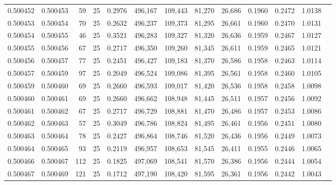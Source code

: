 \begin{tabular}{rrrrrrrrrrrrr}
0.500452 & 0.500453 &  59 &  25 &                                     0.2976 & 496,167 & 109,443 &  81,270 &  26,686 & 0.1960 & 0.2472 & 1.0138 \\
0.500453 & 0.500454 &  70 &  25 &                                     0.2632 & 496,237 & 109,373 &  81,295 &  26,661 & 0.1960 & 0.2470 & 1.0131 \\
0.500454 & 0.500455 &  46 &  25 &                                     0.3521 & 496,283 & 109,327 &  81,320 &  26,636 & 0.1959 & 0.2467 & 1.0127 \\
0.500455 & 0.500456 &  67 &  25 &                                     0.2717 & 496,350 & 109,260 &  81,345 &  26,611 & 0.1959 & 0.2465 & 1.0121 \\
0.500456 & 0.500457 &  77 &  25 &                                     0.2451 & 496,427 & 109,183 &  81,370 &  26,586 & 0.1958 & 0.2463 & 1.0114 \\
0.500457 & 0.500459 &  97 &  25 &                                     0.2049 & 496,524 & 109,086 &  81,395 &  26,561 & 0.1958 & 0.2460 & 1.0105 \\
0.500459 & 0.500460 &  69 &  25 &                                     0.2660 & 496,593 & 109,017 &  81,420 &  26,536 & 0.1958 & 0.2458 & 1.0098 \\
0.500460 & 0.500461 &  69 &  25 &                                     0.2660 & 496,662 & 108,948 &  81,445 &  26,511 & 0.1957 & 0.2456 & 1.0092 \\
0.500461 & 0.500462 &  67 &  25 &                                     0.2717 & 496,729 & 108,881 &  81,470 &  26,486 & 0.1957 & 0.2453 & 1.0086 \\
0.500462 & 0.500463 &  57 &  25 &                                     0.3049 & 496,786 & 108,824 &  81,495 &  26,461 & 0.1956 & 0.2451 & 1.0080 \\
0.500463 & 0.500464 &  78 &  25 &                                     0.2427 & 496,864 & 108,746 &  81,520 &  26,436 & 0.1956 & 0.2449 & 1.0073 \\
0.500464 & 0.500465 &  93 &  25 &                                     0.2119 & 496,957 & 108,653 &  81,545 &  26,411 & 0.1955 & 0.2446 & 1.0065 \\
0.500466 & 0.500467 & 112 &  25 &                                     0.1825 & 497,069 & 108,541 &  81,570 &  26,386 & 0.1956 & 0.2444 & 1.0054 \\
0.500467 & 0.500469 & 121 &  25 &                                     0.1712 & 497,190 & 108,420 &  81,595 &  26,361 & 0.1956 & 0.2442 & 1.0043 \\

\end{tabular}

